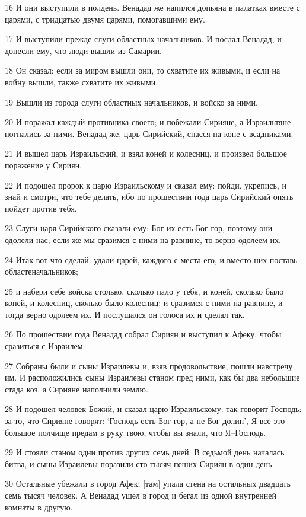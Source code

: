 \par 16 И они выступили в полдень. Венадад же напился допьяна в палатках вместе с царями, с тридцатью двумя царями, помогавшими ему.
\par 17 И выступили прежде слуги областных начальников. И послал Венадад, и донесли ему, что люди вышли из Самарии.
\par 18 Он сказал: если за миром вышли они, то схватите их живыми, и если на войну вышли, также схватите их живыми.
\par 19 Вышли из города слуги областных начальников, и войско за ними.
\par 20 И поражал каждый противника своего; и побежали Сирияне, а Израильтяне погнались за ними. Венадад же, царь Сирийский, спасся на коне с всадниками.
\par 21 И вышел царь Израильский, и взял коней и колесниц, и произвел большое поражение у Сириян.
\par 22 И подошел пророк к царю Израильскому и сказал ему: пойди, укрепись, и знай и смотри, что тебе делать, ибо по прошествии года царь Сирийский опять пойдет против тебя.
\par 23 Слуги царя Сирийского сказали ему: Бог их есть Бог гор, поэтому они одолели нас; если же мы сразимся с ними на равнине, то верно одолеем их.
\par 24 Итак вот что сделай: удали царей, каждого с места его, и вместо них поставь областеначальников;
\par 25 и набери себе войска столько, сколько пало у тебя, и коней, сколько было коней, и колесниц, сколько было колесниц; и сразимся с ними на равнине, и тогда верно одолеем их. И послушался он голоса их и сделал так.
\par 26 По прошествии года Венадад собрал Сириян и выступил к Афеку, чтобы сразиться с Израилем.
\par 27 Собраны были и сыны Израилевы и, взяв продовольствие, пошли навстречу им. И расположились сыны Израилевы станом пред ними, как бы два небольшие стада коз, а Сирияне наполнили землю.
\par 28 И подошел человек Божий, и сказал царю Израильскому: так говорит Господь: за то, что Сирияне говорят: `Господь есть Бог гор, а не Бог долин', Я все это большое полчище предам в руку твою, чтобы вы знали, что Я--Господь.
\par 29 И стояли станом одни против других семь дней. В седьмой день началась битва, и сыны Израилевы поразили сто тысяч пеших Сириян в один день.
\par 30 Остальные убежали в город Афек; [там] упала стена на остальных двадцать семь тысяч человек. А Венадад ушел в город и бегал из одной внутренней комнаты в другую.
